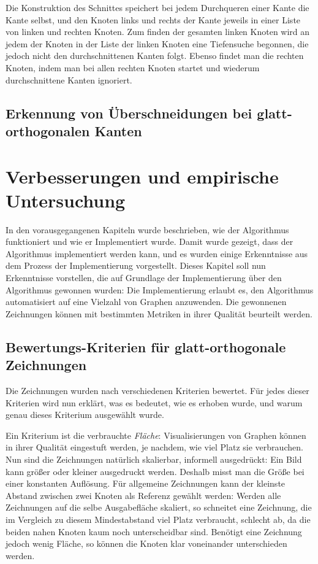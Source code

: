 \documentclass[a4paper]{scrreprt}
\theoremstyle{definition}
\begin{document}
Die Konstruktion des Schnittes speichert bei jedem Durchqueren einer Kante die Kante selbst, und den Knoten links und rechts der Kante jeweils in einer Liste von linken und rechten Knoten. Zum finden der gesamten linken Knoten wird an jedem der Knoten in der Liste der linken Knoten eine Tiefensuche begonnen, die jedoch nicht den durchschnittenen Kanten folgt. Ebenso findet man die rechten Knoten, indem man bei allen rechten Knoten startet und wiederum durchschnittene Kanten ignoriert.

\section{Erkennung von Überschneidungen bei glatt-orthogonalen Kanten}


\chapter{Verbesserungen und empirische Untersuchung}

In den vorausgegangenen Kapiteln wurde beschrieben, wie der Algorithmus funktioniert und wie er Implementiert wurde. Damit wurde gezeigt, dass der Algorithmus implementiert werden kann, und es wurden einige Erkenntnisse aus dem Prozess der Implementierung vorgestellt. Dieses Kapitel soll nun Erkenntnisse vorstellen, die auf Grundlage der Implementierung über den Algorithmus gewonnen wurden: Die Implementierung erlaubt es, den Algorithmus automatisiert auf eine Vielzahl von Graphen anzuwenden. Die gewonnenen Zeichnungen können mit bestimmten Metriken in ihrer Qualität beurteilt werden.

\section{Bewertungs-Kriterien für glatt-orthogonale Zeichnungen}

Die Zeichnungen wurden nach verschiedenen Kriterien bewertet. Für jedes dieser Kriterien wird nun erklärt, was es bedeutet, wie es erhoben wurde, und warum genau dieses Kriterium ausgewählt wurde.

Ein Kriterium ist die verbrauchte \emph{Fläche}: Visualisierungen von Graphen können in ihrer Qualität eingestuft werden, je nachdem, wie viel Platz sie verbrauchen. Nun sind die Zeichnungen natürlich skalierbar, informell ausgedrückt: Ein Bild kann größer oder kleiner ausgedruckt werden. Deshalb misst man die Größe bei einer konstanten Auflösung. Für allgemeine Zeichnungen kann der kleinste Abstand zwischen zwei Knoten als Referenz gewählt werden: Werden alle Zeichnungen auf die selbe Ausgabefläche skaliert, so schneitet eine Zeichnung, die im Vergleich zu diesem Mindestabstand viel Platz verbraucht, schlecht ab, da die beiden nahen Knoten kaum noch unterscheidbar sind. Benötigt eine Zeichnung jedoch wenig Fläche, so können die Knoten klar voneinander unterschieden werden.
\end{document}
